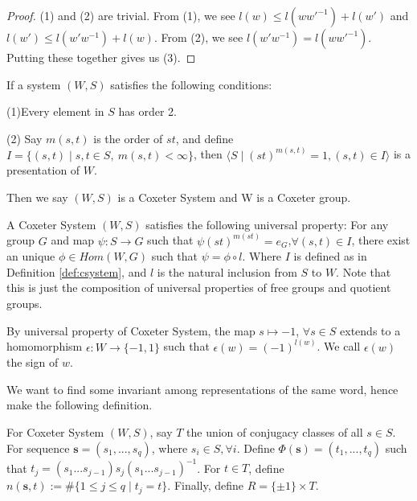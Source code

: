 \begin{proof}
    (1) and (2) are trivial. From (1), we see $l(w) \le l(ww'^{-1})+l(w')$ and $l(w') \le l(w'w^{-1})+l(w)$. From (2), we see $l(w'w^{-1})=l(ww'^{-1})$. Putting these together gives us (3).
\end{proof} 


\begin{definition} \label{def:csystem}
    If a system $(W,S)$ satisfies the following conditions:

\indent (1)Every element in $S$ has order 2.

\indent (2) Say $m(s,t)$ is the order of $st$, and define $I = \{ (s,t) \mid s,t \in S,\ m(s,t) < \infty \}$, then $\langle S \mid (st)^{m(s,t)}=1,(s,t)\in I \rangle$ is a presentation of $W$.

Then we say $(W,S)$ is a Coxeter System and W is a Coxeter group.
\end{definition} 


\begin{remark}
    A Coxeter System $(W,S)$ satisfies the following universal property: For any group $G$ and map $\psi:S \rightarrow G$ such that $\psi(st) ^{m(st)}=e_G$,$\forall(s,t) \in I$, there exist an unique $\phi \in Hom(W,G)$ such that $\psi=\phi \circ l$. Where $I$ is defined as in Definition \ref{def:csystem}, and $l$ is the natural inclusion from $S$ to $W$. Note that this is just the composition of universal properties of free groups and quotient groups.
\end{remark} 


\begin{example} \label{eg:sign}
    By universal property of Coxeter System, the map $s \mapsto -1$, $\forall s \in S$ extends to a homomorphism $\epsilon :W \rightarrow \{-1,1\}$ such that $\epsilon(w)=(-1)^{l(w)}$. We call $\epsilon(w)$ the sign of $w$. 
\end{example} 


We want to find some invariant among representations of the same word, hence make the following definition.


\begin{definition}
    For Coxeter System $(W,S)$, say $T$ the union of conjugacy classes of all $s \in S$. For sequence $\mathbf{s}=(s_1,...,s_q)$, where $s_i \in S,\forall i$. Define $\Phi(\mathbf{s})=(t_1,...,t_q)$ such that $t_j=(s_1...s_{j-1})s_j(s_1...s_{j-1})^{-1}$. For $t\in T$, define $n(\mathbf{s},t):= \# \{1\le j \le q \mid t_j=t\}$. Finally, define $R=\{\pm 1\} \times T$.
\end{definition} 

